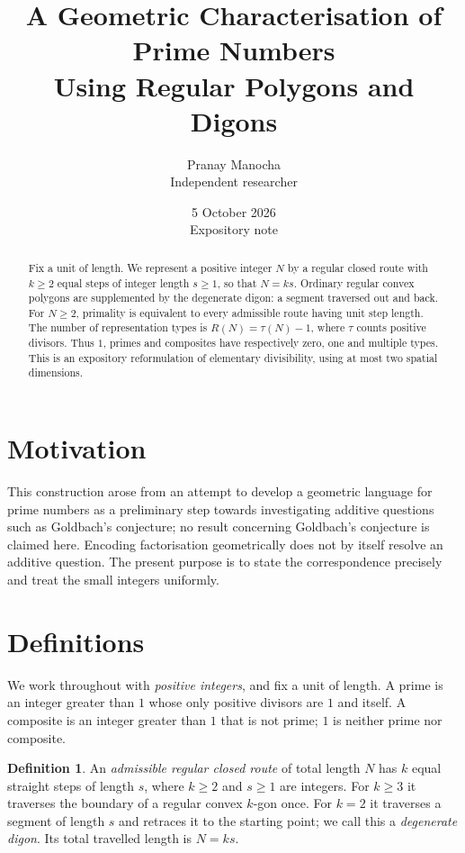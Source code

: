 \documentclass[11pt,a4paper]{article}
\title{A Geometric Characterisation of Prime Numbers\\Using Regular Polygons and Digons}
\author{Pranay Manocha\\[3pt]\small Independent researcher}
\date{5 October 2026\\[3pt]\small Expository note}
\theoremstyle{definition}
\newtheorem{definition}[theorem]{Definition}
\begin{document}
\maketitle
\begin{abstract}
Fix a unit of length. We represent a positive integer $N$ by a regular
closed route with $k\ge2$ equal steps of integer length $s\ge1$, so that
$N=ks$. Ordinary regular convex polygons are supplemented by the
degenerate digon: a segment traversed out and back. For $N\ge2$, primality
is equivalent to every admissible route having unit step length. The
number of representation types is $R(N)=\tau(N)-1$, where $\tau$ counts
positive divisors. Thus $1$, primes and composites have respectively
zero, one and multiple types. This is an expository reformulation of
elementary divisibility, using at most two spatial dimensions.
\end{abstract}

\section{Motivation}
This construction arose from an attempt to develop a geometric language
for prime numbers as a preliminary step towards investigating additive
questions such as Goldbach's conjecture; no result concerning Goldbach's
conjecture is claimed here. Encoding factorisation geometrically does not
by itself resolve an additive question. The present purpose is to state
the correspondence precisely and treat the small integers uniformly.

\section{Definitions}
We work throughout with \emph{positive integers}, and fix a unit of length.
A prime is an integer greater than $1$ whose only positive divisors are
$1$ and itself. A composite is an integer greater than $1$ that is not
prime; $1$ is neither prime nor composite.

\begin{definition}
An \emph{admissible regular closed route} of total length $N$ has $k$ equal
straight steps of length $s$, where $k\ge2$ and $s\ge1$ are integers.
For $k\ge3$ it traverses the boundary of a regular convex $k$-gon once.
For $k=2$ it traverses a segment of length $s$ and retraces it to the
starting point; we call this a \emph{degenerate digon}. Its total
travelled length is $N=ks$.
\end{definition}
\end{document}
